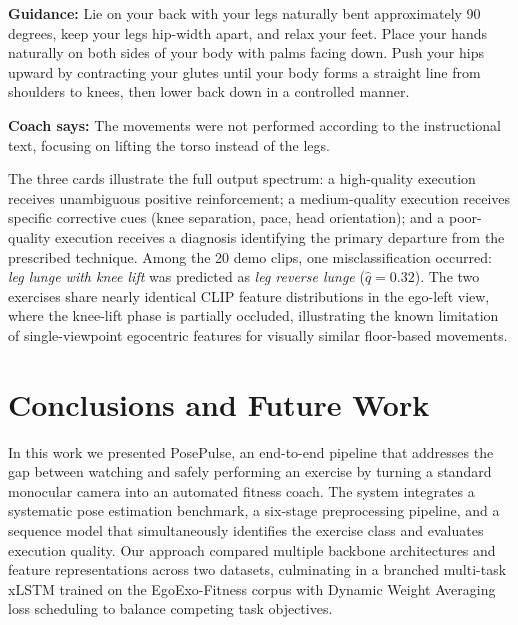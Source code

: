 \documentclass[conference,onecolumn,oneside]{IEEEtran}
\begin{document}
\begin{singlespace}
\begin{tcolorbox}[
  enhanced,
  title={\textbf{Shoulder Bridge} \hfill
         \textbf{Quality:}\ 0.19\ /\ 1.00 \quad \textcolor{white}{\checkmark}\ Correct},
  colback=red!4!white,
  colframe=red!60!black,
  colbacktitle=red!60!black,
  coltitle=white,
  fonttitle=\small\bfseries,
  left=4pt, right=4pt, top=3pt, bottom=3pt,
  breakable
]
  \textbf{\small Guidance:} {\small Lie on your back with your legs naturally bent
  approximately 90 degrees, keep your legs hip-width apart, and relax your feet. Place
  your hands naturally on both sides of your body with palms facing down. Push your hips
  upward by contracting your glutes until your body forms a straight line from shoulders
  to knees, then lower back down in a controlled manner.}

  \tcblower
  \textbf{\small Coach says:} {\small The movements were not performed according to the
  instructional text, focusing on lifting the torso instead of the legs.}
\end{tcolorbox}

\end{singlespace}

\vspace{0.6em}
The three cards illustrate the full output spectrum: a high-quality
execution receives unambiguous positive reinforcement; a medium-quality
execution receives specific corrective cues (knee separation, pace,
head orientation); and a poor-quality execution receives a diagnosis
identifying the primary departure from the prescribed technique.
Among the 20 demo clips, one misclassification occurred: \emph{leg lunge
with knee lift} was predicted as \emph{leg reverse lunge}
($\hat{q} = 0.32$). The two exercises share nearly identical CLIP
feature distributions in the ego-left view, where the knee-lift
phase is partially occluded, illustrating the known limitation of
single-viewpoint egocentric features for visually similar floor-based
movements.

\section{Conclusions and Future Work}

In this work we presented PosePulse, an end-to-end pipeline that addresses
the gap between watching and safely performing an exercise by turning a
standard monocular camera into an automated fitness coach. The system
integrates a systematic pose estimation benchmark, a six-stage
preprocessing pipeline, and a sequence model that simultaneously
identifies the exercise class and evaluates execution quality. Our
approach compared multiple backbone architectures and feature
representations across two datasets, culminating in a branched
multi-task xLSTM trained on the EgoExo-Fitness corpus with Dynamic
Weight Averaging loss scheduling to balance competing task objectives.
\end{document}
